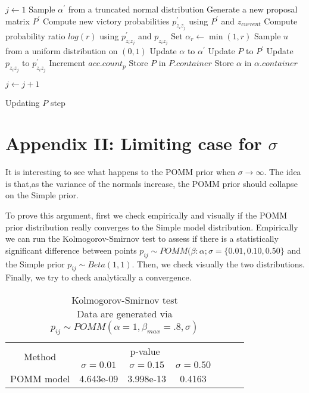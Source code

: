 \documentclass[11pt]{amsart}
\begin{document}
\begin{algorithm}
\begin{algorithmic}[1]
\State $j \gets 1$
\State Sample $\alpha^{\prime}$ from a truncated normal distribution
\State Generate a new proposal matrix $P^{\prime}$
\State Compute new victory probabilities $p_{z_iz_j}^{\prime}$ using $P^{\prime}$ and $z_{current}$
\State Compute probability ratio $log(r)$ using $p_{z_iz_j}^{\prime}$ and $p_{z_iz_j}$
\State Set $\alpha_{r} \gets \min(1, r)$
\State Sample $u$ from a uniform distribution on $(0,1)$
\State Update $\alpha$ to $\alpha^{\prime}$
\State Update $P$ to $P^{\prime}$
\State Update $p_{z_iz_j}$ to $p_{z_iz_j}^{\prime}$
\State Increment $acc.count_{p}$
\EndIf
\State Store $P$ in $P.container$
\State Store $\alpha$ in $\alpha.container$

\State $j \gets j+1$
\EndWhile
\end{algorithmic}
\label{alg:P_update}
\caption{Updating $P$ step}
\end{algorithm}

\clearpage
\section{Appendix II: Limiting case for $\sigma$}

It is interesting to see what happens to the POMM prior when $\sigma \rightarrow \infty$. The idea is that,as the variance of the normals increase, the POMM prior should collapse on the Simple prior. 

To prove this argument, first we check empirically and visually if the POMM prior distribution really converges to the Simple model distribution. Empirically we can run the Kolmogorov-Smirnov test to assess if there is a statistically significant difference between points $p_{ij} \sim POMM(\beta:\alpha;\sigma = \{0.01,0.10,0.50\}$ and the Simple prior $p_{ij} \sim Beta(1,1)$. Then, we check visually the two distributions. Finally, we try to check analytically a convergence.


\begin{table}[htbp]
\centering
\caption{
{\large Kolmogorov-Smirnov test} \\ 
{\small Data are generated via $p_{ij} \sim POMM(\alpha=1,\beta_{max}=.8,\sigma)$} }
\begin{tabular}{ccccccc}
\toprule
\multirow{2}{*}{Method} & \multicolumn{3}{c}{
p-value}  \\
\cmidrule(lr){2-4} \cmidrule(lr){5-7}
& $\sigma = 0.01$ & $\sigma = 0.15$  & $\sigma = 0.50$    \\
\midrule
POMM model  &4.643e-09& 3.998e-13 & 0.4163 \\
\bottomrule
\end{tabular}
\label{table:ks_test_appendix}
\end{table}
\end{document}
